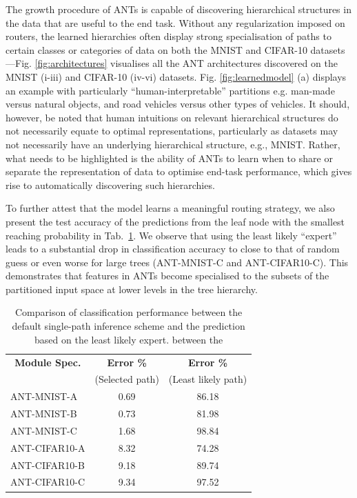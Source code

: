 The growth procedure of ANTs is capable of discovering hierarchical structures in the data that are useful to the end task. Without any regularization imposed on routers, the learned hierarchies often display strong specialisation of paths to certain classes or categories of data on both the MNIST and CIFAR-10 datasets---Fig. \ref{fig:architectures} visualises all the ANT architectures discovered on the MNIST (i-iii) and CIFAR-10 (iv-vi) datasets. Fig. \ref{fig:learnedmodel} (a) displays an example with particularly ``human-interpretable'' partitions e.g. man-made versus natural objects, and road vehicles versus other types of vehicles. It should, however, be noted that human intuitions on relevant hierarchical structures do not necessarily equate to optimal representations, particularly as datasets may not necessarily have an underlying hierarchical structure, e.g., MNIST. Rather, what needs to be highlighted is the ability of ANTs to learn when to share or separate the representation of data to optimise end-task performance, which gives rise to automatically discovering such hierarchies. 

To further attest that the model learns a meaningful routing strategy, we also present the test accuracy of the predictions from the leaf node with the smallest reaching probability in Tab.~\ref{tab:test_routers}. We observe that using the least likely ``expert'' leads to a substantial drop in classification accuracy to close to that of random guess or even worse for large trees (ANT-MNIST-C and ANT-CIFAR10-C). This demonstrates that features in ANTs become specialised to the subsets of the partitioned input space at lower levels in the tree hierarchy. 

\begin{table}[h]
	\caption{\footnotesize Comparison of classification performance between the default single-path inference scheme and the prediction based on the least likely expert. \label{tab:test_routers} between the }
	\footnotesize
	\center
	\begin{tabular}{|l|c|c|}
		\hline
		\multicolumn{1}{|c}{\textbf{Module Spec.}} &  \multicolumn{1}{|c|}{\textbf{Error \%}} & \multicolumn{1}{c|}{\textbf{Error \%}}  \\
		&(Selected path) & (Least likely path)  \\
		\hline
		ANT-MNIST-A &0.69 & 86.18  \\
		ANT-MNIST-B &0.73 & 81.98  \\
		ANT-MNIST-C &1.68 & 98.84  \\
		ANT-CIFAR10-A & 8.32 & 74.28  \\
		ANT-CIFAR10-B & 9.18 & 89.74  \\
		ANT-CIFAR10-C & 9.34 & 97.52  \\
		\hline
	\end{tabular}
\end{table}

